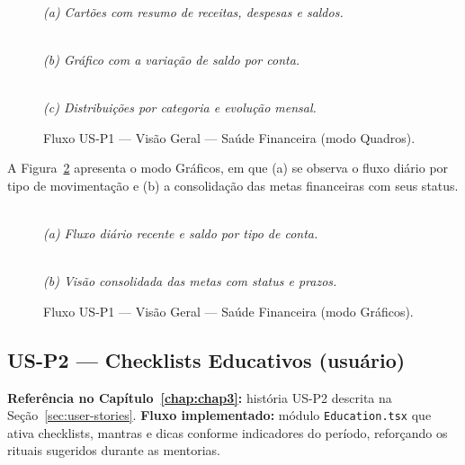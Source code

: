 \begin{figure}[!htbp]
\centering
{}\\
\smallskip
\textit{(a) Cartões com resumo de receitas, despesas e saldos.}

\par\medskip

\\
\smallskip
\textit{(b) Gráfico com a variação de saldo por conta.}

\par\medskip

\\
\smallskip
\textit{(c) Distribuições por categoria e evolução mensal.}
\caption{Fluxo US-P1 — Visão Geral — Saúde Financeira (modo Quadros).}
\label{fig:us-p1}
\end{figure}

A Figura~\ref{fig:us-p1b} apresenta o modo Gráficos, em que (a) se observa o fluxo diário por tipo de movimentação e (b) a consolidação das metas financeiras com seus status.

\begin{figure}[!htbp]
\centering
{}\\
\smallskip
\textit{(a) Fluxo diário recente e saldo por tipo de conta.}

\par\medskip

\\
\smallskip
\textit{(b) Visão consolidada das metas com status e prazos.}
\caption{Fluxo US-P1 — Visão Geral — Saúde Financeira (modo Gráficos).}
\label{fig:us-p1b}
\end{figure}

\FloatBarrier

\subsection{US-P2 — Checklists Educativos (usuário)}
\textbf{Referência no Capítulo~\ref{chap:chap3}:} história US-P2 descrita na Seção~\ref{sec:user-stories}.
\textbf{Fluxo implementado:} módulo \texttt{Education.tsx} que ativa checklists, mantras e dicas conforme indicadores do período, reforçando os rituais sugeridos durante as mentorias.

